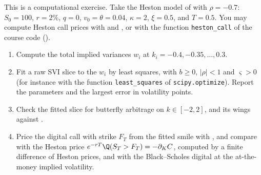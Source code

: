 \begin{exercise}\label{ex:iv-svi-fit}
\medium This is a computational exercise. Take the Heston model of  with $\rho=-0.7$:
$S_0=100$, $r=2\%$, $q=0$, $v_0=\theta=0.04$, $\kappa=2$, $\xi=0.5$, and $T=0.5$. You may compute Heston call
prices with  and , or with the function \texttt{heston\_call}
of the course code ().
\begin{enumerate}[label=(\alph*)]
  \item Compute the total implied variances $w_i$ at $k_i=-0.4,-0.35,\dots,0.3$.
  \item Fit a raw SVI slice to the $w_i$ by least squares, with $b\ge0$, $|\rho|<1$ and $\varsigma>0$ (for
    instance with the function \texttt{least\_squares} of \texttt{scipy.optimize}). Report the parameters
    and the largest error in volatility points.
  \item Check the fitted slice for butterfly arbitrage on $k\in[-2,2]$, and its wings against
    .
  \item Price the digital call with strike $F_T$ from the fitted smile with , and
    compare with the Heston price $e^{-rT}\Q(S_T>F_T)=-\partial_KC$, computed by a finite difference of Heston
    prices, and with the Black--Scholes digital at the at-the-money implied volatility.
\end{enumerate}
\end{exercise}
